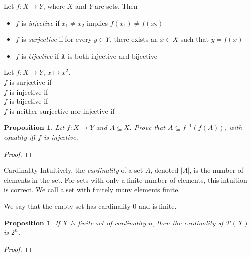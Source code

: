 \documentclass [aspectratio=169, handout]{beamer}
\newcommand{\cP}{\mathcal{P}}
\newtheorem{proposition}[theorem]{Proposition}
\begin{document}
\begin{frame}
\begin{definition}
Let $f:X \to Y$, where $X$ and $Y$ are sets. Then
\begin{itemize}
    \item $f$ is \emph{injective} if $x_1 \neq x_2$ implies $f(x_1) \neq f(x_2)$
    \item $f$ is \emph{surjective} if for every $y \in Y$, there exists an $x \in X$ such that $y = f(x)$
    \item $f$ is \emph{bijective} if it is both injective and bijective
\end{itemize}
\end{definition}

\begin{example}
Let $f:X \to Y$, $ x \mapsto x^2$. \\
$f$ is surjective if \\
$f$ is injective if \\
$f$ is bijective if \\
$f$ is neither surjective nor injective if
\end{example}
\end{frame}


\begin{frame}
\begin{proposition}
Let $f: X \to Y$ and $A \subseteq X$. Prove that $A \subseteq f^{-1}(f(A))$, with equality iff $f$ is injective. 
\end{proposition}
\begin{proof}

\vspace{4cm}
\end{proof}

\end{frame}


\begin{frame}{Cardinality}
Intuitively, the \emph{cardinality} of a set $A$, denoted $|A|$, is the number of elements in the set. For sets with only a finite number of elements, this intuition is correct. We call a set with finitely many elements finite. 

\vspace{1em}

We say that the empty set has cardinality 0 and is finite.



\end{frame}


\begin{frame}

\begin{proposition}
 If $X$ is finite set of cardinality $n$, then the cardinality of $\cP(X)$ is $2^n$.
\end{proposition}

\begin{proof}
\vspace{4cm}
\end{proof}
\end{frame}
\end{document}
